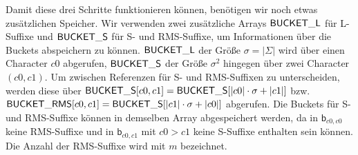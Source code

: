 Damit diese drei Schritte funktionieren können, benötigen wir noch etwas zusätzlichen Speicher. Wir verwenden zwei zusätzliche Arrays $\mathsf{BUCK\-ET\_L}$ für L-Suffixe und $\mathsf{BUCK\-ET\_S}$ für S- und RMS-Suffixe, um Informationen über die Buckets abspeichern zu können. $\mathsf{BUCK\-ET\_L}$ der Größe $\sigma = |\Sigma |$ wird über einen Character $c0$ abgerufen, $\mathsf{BUCK\-ET\_S}$ der Größe $\sigma ^2$ hingegen über zwei Character $(c0,c1)$. Um zwischen Referenzen für S- und RMS-Suffixen zu unterscheiden, werden diese über $\mathsf{BUCK\-ET\_S}[c0,c1] = \mathsf{BUCK\-ET\_S}[|c0| \cdot \sigma + |c1|]$ bzw. $\mathsf{BUCK\-ET\_RMS}[c0,c1] = \mathsf{BUCK\-ET\_S}[|c1| \cdot \sigma + |c0|]$ abgerufen. Die Buckets für S- und RMS-Suffixe können in demselben Array abgespeichert werden, da in $\mathsf{b}_{c0,c0}$ keine RMS-Suffixe und in $\mathsf{b}_{c0,c1}$ mit $c0 > c1$ keine S-Suffixe enthalten sein können. Die Anzahl der RMS-Suffixe wird mit $m$ bezeichnet.






\iffalse
\subsection{Zusammenfassung}
Wir haben einen der schnellsten Algorithmen in der Praxis zur Konstruktion von Suffix-Arrays kennen gelernt. Neben der Unterteilung in L-, S-, und RMS-Suffixe nutzt der Algorithmus auch die Verteilung dieser in den jeweiligen Buckets aus. In der ersten Phase haben wir zunächst die Größen der Buckets gezählt, die RMS-Suffixe sowie ihre relative Positionierung im Text ins Suffix-Array eingetragen und über die Präfixsummen die Grenzen der jeweiligen Buckets berechnet. In der zweiten Phase haben wir erst die RMS-Teilstrings der einzelnen Buckets $\mathsf{b}_{c0,c1}$ mithilfe des Introspective Sorts sortiert, daraufhin das partielle inverse Suffix-Array bestimmt und mit den Rängen des ISA und dem Doppeln der RMS-Substrings die RMS-Suffixe mit einem ähnlichen Verfahren zum Introspective Sort korrekt sortiert. In der letzten Phase haben wir zuerst in einem Durchlauf durch die Ausnutzung der Ordnung innerhalb einzelner Buckets von rechts nach links alle S-Suffixe induziert, in einem zweiten Durchlauf von links nach rechts dann auch die l-Suffixe, was zum korrekt sortierten Suffix-Array führt. 

\fi
